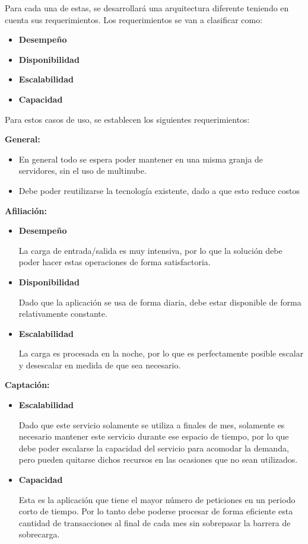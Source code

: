 \documentclass[a4paper]{article}
\begin{document}
Para cada una de estas, se desarrollará una arquitectura diferente teniendo en cuenta sus requerimientos.
Los requerimientos se van a clasificar como:
\begin{itemize}
    \item \textbf{Desempeño}
    \item \textbf{Disponibilidad}
    \item \textbf{Escalabilidad}
    \item \textbf{Capacidad}
\end{itemize}

Para estos casos de uso, se establecen los siguientes requerimientos:

\textbf{General:}
\begin{itemize}
    \item En general todo se espera poder mantener en una misma granja de servidores, sin el uso de multinube.
    \item Debe poder reutilizarse la tecnología existente, dado a que esto reduce costos
\end{itemize} 

\textbf{Afiliación:}
\begin{itemize}
    \item \textbf{Desempeño}
    
    La carga de entrada/salida es muy intensiva, por lo que la solución debe poder 
    hacer estas operaciones de forma satisfactoria.
    
    \item \textbf{Disponibilidad}
    
    Dado que la aplicación se usa de forma diaria, debe estar disponible de forma relativamente
    constante.

    \item \textbf{Escalabilidad}
    
    La carga es procesada en la noche, por lo que es perfectamente posible escalar
    y desescalar en medida de que sea necesario. 

\end{itemize}

\textbf{Captación:}
\begin{itemize}
    \item \textbf{Escalabilidad}
    
    Dado que este servicio solamente se utiliza a finales de mes, solamente es necesario mantener
    este servicio durante ese espacio de tiempo, por lo que debe poder escalarse la capacidad del 
    servicio para acomodar la demanda, pero pueden quitarse dichos recursos en las ocasiones que 
    no sean utilizados.

    \item \textbf{Capacidad}
    
    Esta es la aplicación que tiene el mayor número de peticiones en un periodo corto de
    tiempo. Por lo tanto debe poderse procesar de forma eficiente esta cantidad de transacciones
    al final de cada mes sin sobrepasar la barrera de sobrecarga.

\end{itemize}
\end{document}
